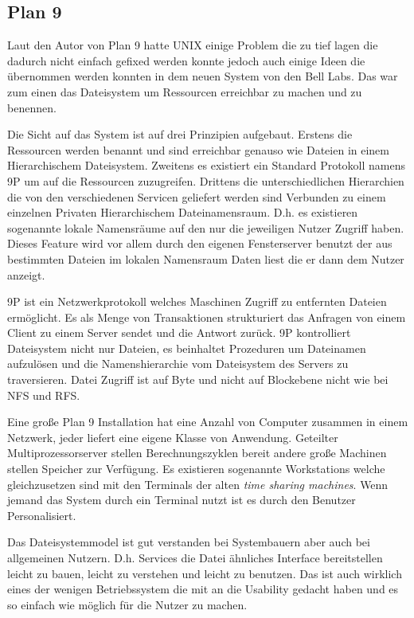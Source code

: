 \documentclass[9pt,technote]{IEEEtran}
\begin{document}
    \subsection{Plan 9}
        Laut den Autor von Plan 9 hatte UNIX einige Problem die zu tief lagen die dadurch nicht einfach gefixed werden konnte jedoch auch einige Ideen die \"ubernommen werden konnten
        in dem neuen System von den Bell Labs. Das war zum einen das Dateisystem um Ressourcen erreichbar zu machen und zu benennen.
    
        Die Sicht auf das System ist auf drei Prinzipien aufgebaut.
        Erstens die Ressourcen werden benannt und sind erreichbar genauso wie Dateien in einem Hierarchischem Dateisystem. Zweitens es existiert ein Standard Protokoll namens 9P um auf die 
        Ressourcen zuzugreifen. Drittens die unterschiedlichen Hierarchien die von den verschiedenen Servicen geliefert werden sind Verbunden zu einem einzelnen Privaten
        Hierarchischem Dateinamensraum. D.h. es existieren sogenannte lokale Namensr\"aume auf den nur die jeweiligen Nutzer Zugriff haben.
        Dieses Feature wird vor allem durch den eigenen Fensterserver benutzt der aus bestimmten Dateien im lokalen Namensraum Daten liest die er dann dem Nutzer anzeigt.
        
        9P ist ein Netzwerkprotokoll welches Maschinen Zugriff zu entfernten Dateien erm\"oglicht.
        Es als Menge von Transaktionen strukturiert das Anfragen von einem Client zu einem Server sendet und die Antwort zur\"uck. 9P kontrolliert Dateisystem nicht nur Dateien,
        es beinhaltet Prozeduren um Dateinamen aufzul\"osen und die Namenshierarchie vom Dateisystem des Servers zu traversieren.
        Datei Zugriff ist auf Byte und nicht auf Blockebene nicht wie bei NFS und RFS.
        
        Eine gro\ss e Plan 9 Installation hat eine Anzahl von Computer zusammen in einem Netzwerk, jeder liefert eine eigene Klasse von Anwendung. Geteilter Multiprozessorserver stellen
        Berechnungszyklen bereit andere gro\ss e Machinen stellen Speicher zur Verf\"ugung. Es existieren sogenannte Workstations welche gleichzusetzen sind mit den 
        Terminals der alten \textit{time sharing machines}. Wenn jemand das System durch ein Terminal nutzt ist es durch den Benutzer Personalisiert.
    
        Das Dateisystemmodel ist gut verstanden bei Systembauern aber auch bei allgemeinen Nutzern. D.h. Services die Datei \"ahnliches Interface bereitstellen leicht zu bauen, leicht zu verstehen
        und leicht zu benutzen. Das ist auch wirklich eines der wenigen Betriebssystem die mit an die Usability gedacht haben und es so einfach wie m\"oglich f\"ur die Nutzer zu machen.
        
\end{document}

